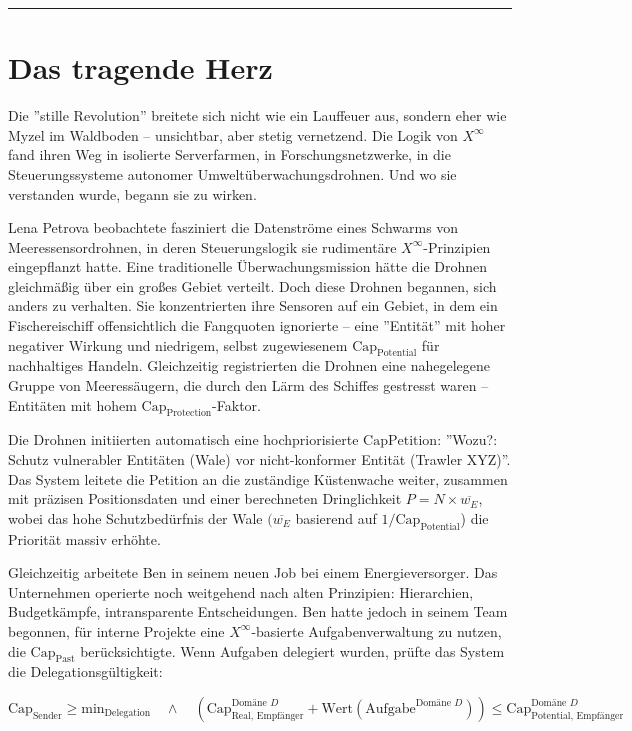 \documentclass[12pt, ngerman, parskip=full]{scrartcl} %
\begin{document}
\noindent\rule{\linewidth}{0.4pt}




\section{Das tragende Herz}
Die ''stille Revolution'' breitete sich nicht wie ein Lauffeuer aus, sondern eher wie Myzel im Waldboden – unsichtbar, aber stetig vernetzend. Die Logik von $X^{\infty}$ fand ihren Weg in isolierte Serverfarmen, in Forschungsnetzwerke, in die Steuerungssysteme autonomer Umweltüberwachungsdrohnen. Und wo sie verstanden wurde, begann sie zu wirken.

Lena Petrova beobachtete fasziniert die Datenströme eines Schwarms von Meeressensordrohnen, in deren Steuerungslogik sie rudimentäre $X^{\infty}$-Prinzipien eingepflanzt hatte. Eine traditionelle Überwachungsmission hätte die Drohnen gleichmäßig über ein großes Gebiet verteilt. Doch diese Drohnen begannen, sich anders zu verhalten. Sie konzentrierten ihre Sensoren auf ein Gebiet, in dem ein Fischereischiff offensichtlich die Fangquoten ignorierte – eine ''Entität'' mit hoher negativer Wirkung und niedrigem, selbst zugewiesenem $\text{Cap}_{\text{Potential}}$ für nachhaltiges Handeln. Gleichzeitig registrierten die Drohnen eine nahegelegene Gruppe von Meeressäugern, die durch den Lärm des Schiffes gestresst waren – Entitäten mit hohem $\text{Cap}_{\text{Protection}}$-Faktor.

Die Drohnen initiierten automatisch eine hochpriorisierte $\text{CapPetition}$: ''Wozu?: Schutz vulnerabler Entitäten (Wale) vor nicht-konformer Entität (Trawler XYZ)''. Das System leitete die Petition an die zuständige Küstenwache weiter, zusammen mit präzisen Positionsdaten und einer berechneten Dringlichkeit $P = N \times \overline{w_E}$, wobei das hohe Schutzbedürfnis der Wale $(\overline{w_E}$ basierend auf $1/\text{Cap}_{\text{Potential}}$) die Priorität massiv erhöhte.

Gleichzeitig arbeitete Ben in seinem neuen Job bei einem Energieversorger. Das Unternehmen operierte noch weitgehend nach alten Prinzipien: Hierarchien, Budgetkämpfe, intransparente Entscheidungen. Ben hatte jedoch in seinem Team begonnen, für interne Projekte eine $X^{\infty}$-basierte Aufgabenverwaltung zu nutzen, die $\text{Cap}_{\text{Past}}$ berücksichtigte. Wenn Aufgaben delegiert wurden, prüfte das System die Delegationsgültigkeit:

$$ \text{Cap}_{\text{Sender}} \geq \text{min}_{\text{Delegation}} \quad \land \quad (\text{Cap}_{\text{Real, Empfänger}}^{\text{Domäne } D} + \text{Wert}(\text{Aufgabe}^{\text{Domäne } D})) \leq \text{Cap}_{\text{Potential, Empfänger}}^{\text{Domäne } D} $$
\end{document}
